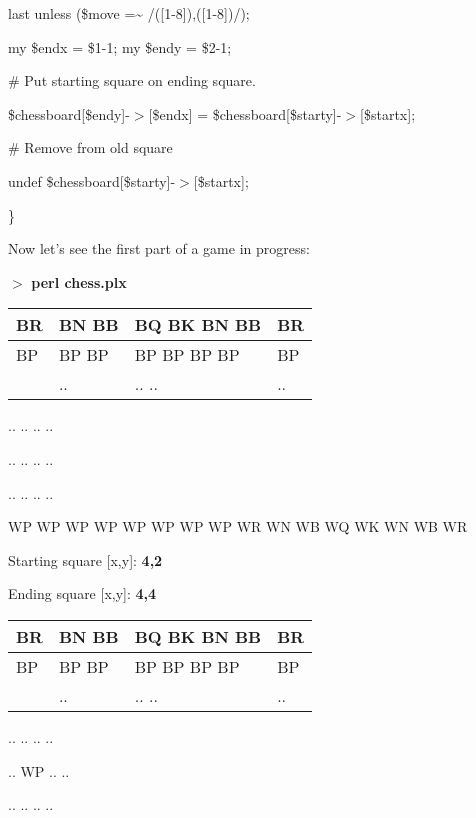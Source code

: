 \documentclass[a4paper,11pt]{book}
\begin{document}
\noindent last unless (\$move =\~{} /([1-8]),([1-8])/);

\noindent my \$endx = \$1-1; my \$endy = \$2-1;

\noindent 

\noindent \# Put starting square on ending square.

\noindent \$chessboard[\$endy]-$>$[\$endx] = \$chessboard[\$starty]-$>$[\$startx];

\noindent \# Remove from old square

\noindent undef \$chessboard[\$starty]-$>$[\$startx];

\noindent \}

\noindent 

\noindent 

\noindent Now let's see the first part of a game in progress:

\noindent 

\noindent $>$ \textbf{perl chess.plx}

\begin{tabular}{|p{0.4in}|p{0.3in}|p{0.7in}|p{0.1in}|} \hline 
BR & BN  BB & BQ  BK  BN  BB & BR \\ \hline 
BP & BP  BP & BP  BP  BP  BP & BP \\ \hline 
 & .. & .. .. & .. \\ \hline 
\end{tabular}

.. .. .. ..

\noindent .. .. .. ..

\noindent .. .. .. ..

\noindent WP  WP WP WP WP WP WP WP WR  WN WB WQ WK WN WB WR

\noindent 

\noindent Starting square [x,y]: \textbf{4,2}

\noindent 

\noindent Ending square [x,y]: \textbf{4,4}

\begin{tabular}{|p{0.4in}|p{0.3in}|p{0.7in}|p{0.1in}|} \hline 
BR & BN  BB & BQ  BK  BN  BB & BR \\ \hline 
BP & BP  BP & BP  BP  BP  BP & BP \\ \hline 
 & .. & .. .. & .. \\ \hline 
\end{tabular}

.. .. .. ..

\noindent .. WP .. ..

\noindent .. .. .. ..
\end{document}
